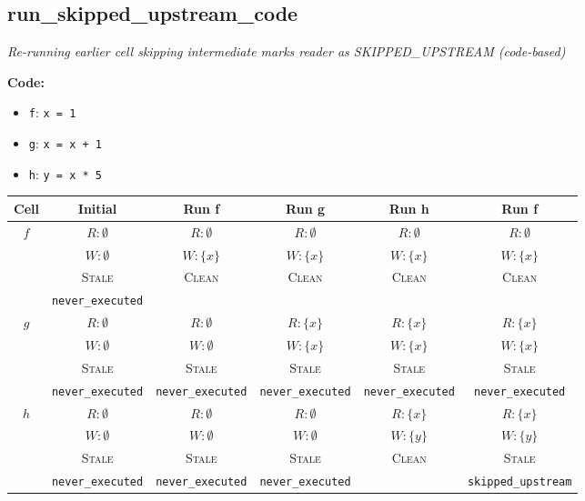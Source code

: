 \documentclass{article}
\begin{document}
\subsection{run\_skipped\_upstream\_code}
\textit{Re-running earlier cell skipping intermediate marks reader as SKIPPED\_UPSTREAM (code-based)}

\textbf{Code:}
\begin{itemize}
  \item \texttt{f}: \verb|x = 1|
  \item \texttt{g}: \verb|x = x + 1|
  \item \texttt{h}: \verb|y = x * 5|
\end{itemize}

\begin{center}
\small
\begin{tabular}{|c|c|c|c|c|c|}
\hline
\textbf{Cell} & \textbf{Initial} & \textbf{Run f} & \textbf{Run g} & \textbf{Run h} & \textbf{Run f} \\
\hline
\multirow{4}{*}{$f$}
  & $R: \emptyset$ & $R: \emptyset$ & $R: \emptyset$ & $R: \emptyset$ & $R: \emptyset$ \\
  & $W: \emptyset$ & $W: \{x\}$ & $W: \{x\}$ & $W: \{x\}$ & $W: \{x\}$ \\
  & \textsc{Stale} & \textsc{Clean} & \textsc{Clean} & \textsc{Clean} & \textsc{Clean} \\
  & \footnotesize\texttt{never\_executed} &  &  &  &  \\
\hline
\multirow{4}{*}{$g$}
  & $R: \emptyset$ & $R: \emptyset$ & $R: \{x\}$ & $R: \{x\}$ & $R: \{x\}$ \\
  & $W: \emptyset$ & $W: \emptyset$ & $W: \{x\}$ & $W: \{x\}$ & $W: \{x\}$ \\
  & \textsc{Stale} & \textsc{Stale} & \textsc{Stale} & \textsc{Stale} & \textsc{Stale} \\
  & \footnotesize\texttt{never\_executed} & \footnotesize\texttt{never\_executed} & \footnotesize\texttt{never\_executed} & \footnotesize\texttt{never\_executed} & \footnotesize\texttt{never\_executed} \\
\hline
\multirow{4}{*}{$h$}
  & $R: \emptyset$ & $R: \emptyset$ & $R: \emptyset$ & $R: \{x\}$ & $R: \{x\}$ \\
  & $W: \emptyset$ & $W: \emptyset$ & $W: \emptyset$ & $W: \{y\}$ & $W: \{y\}$ \\
  & \textsc{Stale} & \textsc{Stale} & \textsc{Stale} & \textsc{Clean} & \textsc{Stale} \\
  & \footnotesize\texttt{never\_executed} & \footnotesize\texttt{never\_executed} & \footnotesize\texttt{never\_executed} &  & \footnotesize\texttt{skipped\_upstream} \\
\hline
\end{tabular}
\end{center}
\end{document}
